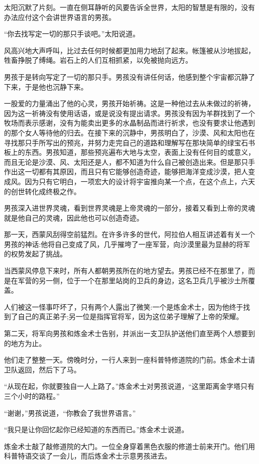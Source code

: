 \documentclass[twoside,openany]{book}
\begin{document}
太阳沉默了片刻。一直在侧耳静听的风要告诉全世界，太阳的智慧是有限的，没有办法应付这个会讲世界语言的男孩。

“你去找写定一切的那只手谈吧。”太阳说道。

风高兴地大声呼叫，比过去任何时候都更加用力地刮了起来。帐篷被从沙地拔起，牲畜挣脱了缚绳。岩石上的人们互相抓紧，以免被抛向远方。

男孩于是转向写定了一切的那只手。男孩没有讲任何话，他感到整个宇宙都沉静了下来，于是他也沉静下来。

一股爱的力量涌出了他的心灵，男孩开始祈祷。这是一种他过去从未做过的祈祷，因为这一祈祷没有使用话语，或是说没有提出请求。男孩没有因为羊群找到了一个牧场而表示感谢，没有为能卖出更多的水晶制品而进行祈求，也没有要求让他遇到的那个女人等待他的归去。在接下来的沉静中，男孩明白了，沙漠、风和太阳也在寻找那只手所写出的预兆，并努力走完自己的道路和理解写在那块简单的绿宝石书板上的东西。男孩知道，那些预兆遍布大地与太空，表面上没有任何目的或意义，而且无论是沙漠、风、太阳还是人，都不知道为什么自己被创造出来。但是那只手作出这一切都有其原因，而且只有它能够创造奇迹，能够把海洋变成沙漠，把人变成风。因为只有它明白，一项宏大的设计将宇宙推向某一个点，在这个点上，六天的创世转化成终极之作。

男孩深入进世界灵魂，看到世界灵魂是上帝灵魂的一部分，接着又看到上帝的灵魂就是他自己的灵魂，因此他也可以创造奇迹。

那一天，西蒙风刮得空前猛烈。在许多许多的世代，阿拉伯人相互讲述着有关一个男孩的神话:他将自己变成了风，几乎摧垮了一座军营，向沙漠里最为显赫的将军的权势发起了挑战。

当西蒙风停息下来时，所有人都朝男孩所在的地方望去。男孩已经不在那里了，而是在军营的另一侧，位于一个在那里站岗的卫兵的身边，这名卫兵几乎被沙土所覆盖。

人们被这一怪事吓坏了，只有两个人露出了微笑:一个是炼金术士，因为他终于找到了自己的真正弟子;另一位是指挥官将军，因为这位弟子理解了上帝的荣耀。

第二天，将军向男孩和炼金术士告别，并派出一支卫队护送他们直至两个人想要到的地方为止。

他们走了整整一天。傍晚时分，一行人来到一座科普特修道院的门前。炼金术士请卫队返回，然后下了马。

“从现在起，你就要独自一人上路了。”炼金术士对男孩说道，“这里距离金字塔只有三个小时的路程。”

“谢谢，”男孩说道，“你教会了我世界语言。”

“我只是让你回忆起你已经知道的东西而已。”炼金术士说道。

炼金术士敲了敲修道院的大门。一位全身穿着黑色衣服的修道士前来开门。他们用科普特语交谈了一会儿，而后炼金术士示意男孩进去。
\end{document}
